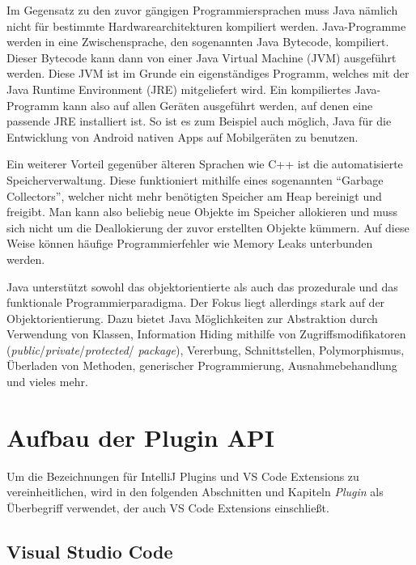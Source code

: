 Im Gegensatz 
zu den zuvor gängigen Programmiersprachen muss Java nämlich nicht für bestimmte 
Hardwarearchitekturen kompiliert werden. Java-Programme werden in eine 
Zwischensprache, den sogenannten Java Bytecode, kompiliert. Dieser Bytecode
kann dann von einer Java Virtual Machine (JVM) ausgeführt werden. Diese JVM ist
im Grunde ein eigenständiges Programm, welches mit der Java Runtime Environment 
(JRE) mitgeliefert wird. Ein kompiliertes Java-Programm kann also auf 
allen Geräten ausgeführt werden, auf denen eine passende JRE installiert ist. 
So ist es zum Beispiel auch möglich, Java für die Entwicklung von Android nativen
Apps auf Mobilgeräten zu benutzen.

Ein weiterer Vorteil gegenüber älteren Sprachen wie C++ ist die
automatisierte Speicherverwaltung. Diese funktioniert mithilfe eines 
sogenannten \enquote{Garbage Collectors}, welcher nicht mehr benötigten Speicher
am Heap bereinigt und freigibt. Man kann also beliebig neue Objekte im Speicher
allokieren und muss sich nicht um die Deallokierung der zuvor erstellten Objekte
kümmern. Auf diese Weise können häufige Programmierfehler wie Memory Leaks unterbunden werden.

Java unterstützt sowohl das objektorientierte als auch das prozedurale und das funktionale 
Programmierparadigma. Der Fokus liegt allerdings stark auf der Objektorientierung. 
Dazu bietet Java Möglichkeiten zur Abstraktion durch Verwendung von Klassen, Information Hiding
mithilfe von Zugriffsmodifikatoren (\emph{public}/\emph{private}/\emph{protected}/\linebreak
\emph{package}), Vererbung, 
Schnittstellen, Polymorphismus, Überladen von Methoden, generischer Programmierung, 
Ausnahmebehandlung und vieles mehr.


\section{Aufbau der Plugin API}
\label{sec:AufbauDerPluginAPI}

Um die Bezeichnungen für IntelliJ Plugins und VS Code Extensions zu vereinheitlichen,
wird in den folgenden Abschnitten und Kapiteln \emph{Plugin} als Überbegriff
verwendet, der auch VS Code Extensions einschließt.

\subsection{Visual Studio Code}

